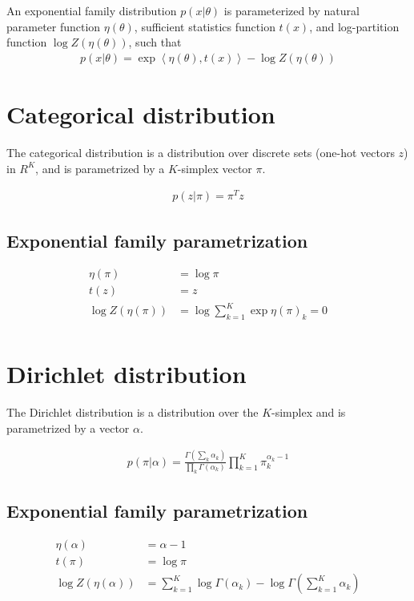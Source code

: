 An exponential family distribution $p(x | \theta)$
is parameterized by 
natural parameter function $\eta(\theta)$,
sufficient statistics function $t(x)$,
and log-partition function  $\log Z(\eta(\theta))$,
such that
\begin{align*}
    p(x | \theta) = \exp{\left\langle\eta(\theta), t(x)\right\rangle - \log Z(\eta(\theta))}
\end{align*}

\section{Categorical distribution}
\label{sec:stats-categorical}
The categorical distribution is a distribution
over discrete sets (one-hot vectors $z$) in $R^K$,
and is parametrized by a $K$-simplex vector $\pi$.

\begin{align*}
    p(z | \pi) = \pi^Tz
\end{align*}
\subsection{Exponential family parametrization}
\begin{align*}
    \eta(\pi) &= \log \pi \\
    t(z) &= z \\
    \log Z(\eta(\pi)) &= \log\sum_{k = 1}^K \exp{\eta(\pi)_k} = 0\\
\end{align*}

\section{Dirichlet distribution}
\label{sec:stats-dirichlet}
The Dirichlet distribution is a distribution
over the $K$-simplex
and is parametrized by a vector $\alpha$.

\begin{align*}
    p(\pi | \alpha) = \frac{\Gamma\left(\sum_k \alpha_k\right)}{\prod_k\Gamma(\alpha_k)}\prod_{k = 1}^K \pi_k^{\alpha_k - 1}
\end{align*}

\subsection{Exponential family parametrization}
\begin{align*}
    \eta(\alpha) &= \alpha - 1\\
    t(\pi) &= \log \pi \\
    \log Z(\eta(\alpha)) &= \sum_{k = 1}^K \log \Gamma(\alpha_k) - \log \Gamma\left(\sum_{k = 1}^K \alpha_k\right)
\end{align*}

